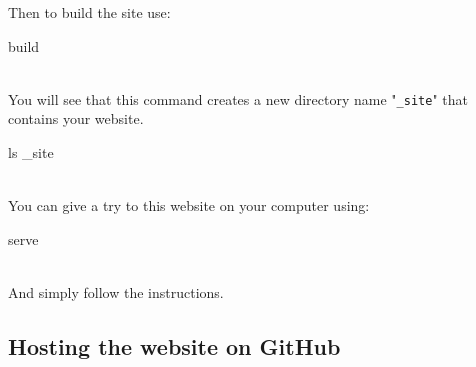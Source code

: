 \noindent Then to build the site use:
\begin{script}
    build
\end{script}\\[-0.75cm]
\noindent You will see that this command creates a new directory name "\texttt{\_site}" that contains your website. 
\begin{script}
 ls \_site

\end{script}\\[-0.75cm]
\noindent You can give a try to this website on your computer using: 
\begin{script}
    serve
\end{script}\\[-0.75cm]
\noindent And simply follow the instructions.
\newpage

\subsection{Hosting the website on GitHub}

